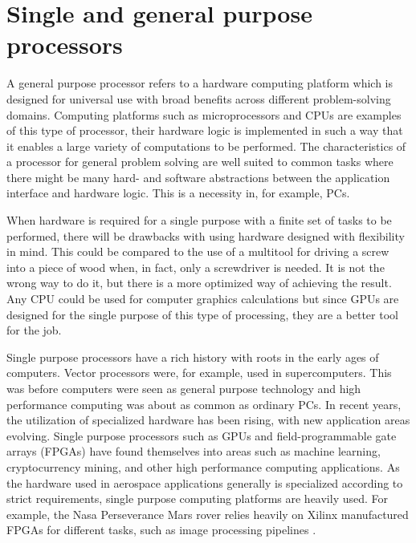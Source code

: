 \documentclass[12pt]{report}
\begin{document}
\section{Single and general purpose processors}
A general purpose processor refers to a hardware computing platform which is designed for universal use with broad benefits across different problem-solving domains. Computing platforms such as microprocessors and CPUs are examples of this type of processor, their hardware logic is implemented in such a way that it enables a large variety of computations to be performed. 
The characteristics of a processor for general problem solving are well suited to common tasks where there might be many hard- and software abstractions between the application interface and hardware logic. This is a necessity in, for example, PCs.
\par
When hardware is required for a single purpose with a finite set of tasks to be performed, there will be drawbacks with using hardware designed with flexibility in mind. This could be compared to the use of a multitool for driving a screw into a piece of wood when, in fact, only a screwdriver is needed. It is not the wrong way to do it, but there is a more optimized way of achieving the result. Any CPU could be used for computer graphics calculations but since GPUs are designed for the single purpose of this type of processing, they are a better tool for the job.
\par
Single purpose processors have a rich history with roots in the early ages of computers. Vector processors were, for example, used in supercomputers.
This was before computers were seen as general purpose technology and high performance computing was about as common as ordinary PCs.
In recent years, the utilization of specialized hardware has been rising, with new application areas evolving. Single purpose processors such as GPUs and field-programmable gate arrays (FPGAs) have found themselves into areas such as machine learning, cryptocurrency mining, and other high performance computing applications.
As the hardware used in aerospace applications generally is specialized according to strict requirements, single purpose computing platforms are heavily used. For example, the Nasa Perseverance Mars rover relies heavily on Xilinx manufactured FPGAs for different tasks, such as image processing pipelines \citep
{XilPerservance}.
\end{document}
